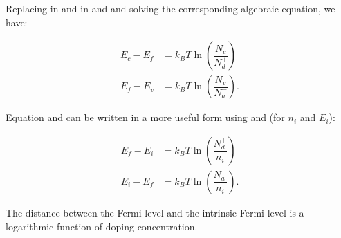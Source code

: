Replacing  in   and  in  and  and solving the corresponding algebraic equation, we have:
 
 \begin{align}
 E_c-E_f & = k_B T\ln\left(\dfrac{N_c}{N_d^+}\right)  \label{eq: Ef in n-type}\\
 E_f-E_v & = k_B T\ln\left(\dfrac{N_v}{N_a^-}\right) . \label{eq: Ef in p-type}
 \end{align}

Equation  and  can be written in a more useful form using  and  (for $n_i$ and $E_i$):

 \begin{align}
 E_f-E_i & = k_B T\ln\left(\dfrac{N_d^+}{n_i}\right)  \label{eq: Ef in n-type Ei} \\
 E_i-E_f & = k_B T\ln\left(\dfrac{N_a^-}{n_i}\right).  \label{eq: Ef in p-type Ei} 
 \end{align}



\begin{Osservazione}
The distance between the Fermi level and the intrinsic Fermi level is a logarithmic function of doping concentration.
\end{Osservazione}


